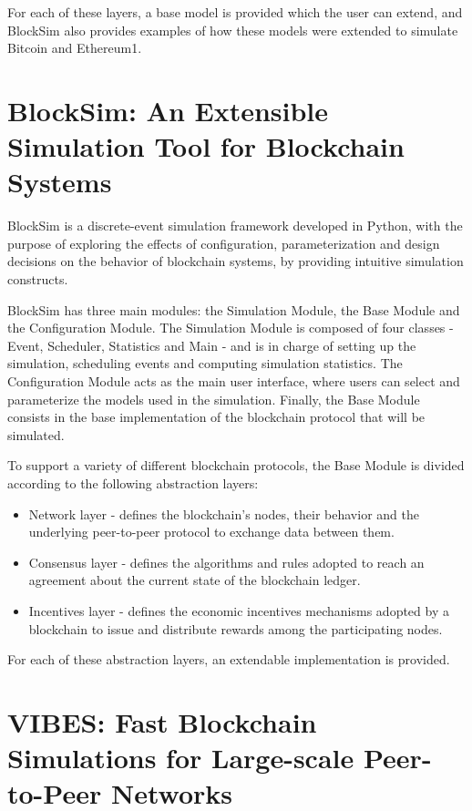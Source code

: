 For each of these layers, a base model is provided which the user can extend, and BlockSim also provides examples of how these models were extended to simulate Bitcoin and Ethereum1.


\section{BlockSim: An Extensible Simulation Tool for Blockchain Systems}
\label{sec:blocksim2}

BlockSim \cite{blocksim2} is a discrete-event simulation framework developed in Python, with the purpose of exploring the effects of configuration, parameterization and design decisions on the behavior of blockchain systems, by providing intuitive simulation constructs.

BlockSim has three main modules: the Simulation Module, the Base Module and the Configuration Module. The Simulation Module is composed of four classes - Event, Scheduler, Statistics and Main - and is in charge of setting up the simulation, scheduling events and computing simulation statistics. The Configuration Module acts as the main user interface, where users can select and parameterize the models used in the simulation. Finally, the Base Module consists in the base implementation of the blockchain protocol that will be simulated.

To support a variety of different blockchain protocols, the Base Module is divided according to the following abstraction layers:

\begin{itemize}
    \item Network layer - defines the blockchain’s nodes, their behavior and the underlying peer-to-peer protocol to exchange data between them.
    \item Consensus layer - defines the algorithms and rules adopted to reach an agreement about the current state of the blockchain ledger.
    \item Incentives layer - defines the economic incentives mechanisms adopted by a blockchain to issue and distribute rewards among the participating nodes.
\end{itemize}

For each of these abstraction layers, an extendable implementation is provided.


\section{VIBES: Fast Blockchain Simulations for Large-scale Peer-to-Peer Networks}
\label{sec:vibes}

